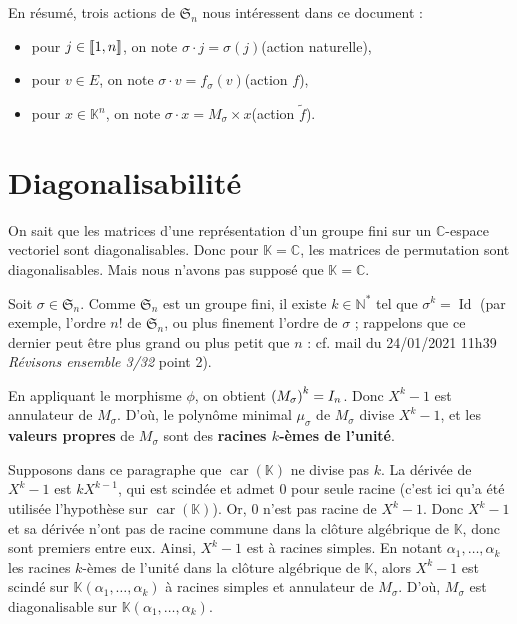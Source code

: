 \documentclass[10pt,a4paper,french,landscape]{article}
\DeclarePairedDelimiter\parenlong{\lparen}{\rparen}
\newcommand{\paren}[1]{\parenlong*{#1}}
\DeclarePairedDelimiter\bracketlong{\llbracket}{\rrbracket}
\newcommand{\br}[1]{\bracketlong*{#1}}
\theoremstyle{definition}
\theoremstyle{remark}
\DeclareMathOperator{\Id}{Id}
\DeclareMathOperator{\car}{car}
\newcommand{\NNs}{\mathbb N^*}
\newcommand{\CC}{\mathbb C}
\newcommand{\KK}{\mathbb K}
\newcommand{\Sy}{\mathfrak{S}}
\newcommand{\1}{\mathbbm{1}}
\newcommand{\Sn}[1][n]{\Sy_{#1}}
\begin{document}
\begin{multicols*}{2}
En résumé, trois actions de $\Sn$ nous intéressent dans ce document :
\begin{itemize}
\item pour $j\in\br{1,n}$, on note $\sigma\cdot j = \sigma(j)$\quad (action naturelle),
\item pour $v\in E$, on note $\sigma\cdot v = f_\sigma(v)$\quad (action $f$),
\item pour $x\in \KK^n$, on note $\sigma\cdot x = M_\sigma\times x$\quad (action $\tilde{f}$).
\end{itemize}

\section{Diagonalisabilité}
\label{sec:diago}

On sait que les matrices d'une représentation d'un groupe fini sur un $\CC$-espace vectoriel sont diagonalisables. Donc pour $\KK=\CC$, les matrices de permutation sont diagonalisables. Mais nous n'avons pas supposé que $\KK=\CC$.

Soit $\sigma\in\Sn$. Comme $\Sn$ est un groupe fini, il existe $k\in\NNs$ tel que $\sigma^{k}=\Id$ (par exemple, l'ordre $n!$ de $\Sn$, ou plus finement l'ordre de $\sigma$ ; rappelons que ce dernier peut être plus grand ou plus petit que $n$ : cf. mail du 24/01/2021 11h39 \textit{Révisons ensemble 3/32} point 2).

En appliquant le morphisme $\phi$, on obtient $\paren{M_\sigma}^{k}=I_n$. Donc $X^{k}-1$ est annulateur de $M_\sigma$. D'où, le polynôme minimal $\mu_\sigma$ de $M_\sigma$ divise $X^{k}-1$, et les \textbf{valeurs propres} de $M_\sigma$ sont des \textbf{racines $k$-èmes de l'unité}.

Supposons dans ce paragraphe que $\car(\KK)$ ne divise pas $k$. La dérivée de $X^{k}-1$ est $kX^{k-1}$, qui est scindée et admet 0 pour seule racine (c'est ici qu'a été utilisée l'hypothèse sur $\car(\KK)$). Or, 0 n'est pas racine de $X^k-1$. Donc $X^k-1$ et sa dérivée n'ont pas de racine commune dans la clôture algébrique de $\KK$, donc sont premiers entre eux. Ainsi, $X^k-1$ est à racines simples. En notant $\alpha_1, \ldots , \alpha_k$ les racines $k$-èmes de l'unité dans la clôture algébrique de $\KK$, alors $X^k-1$ est scindé sur $\KK(\alpha_1, \ldots , \alpha_k)$ à racines simples et annulateur de $M_\sigma$. D'où, $M_\sigma$ est diagonalisable sur $\KK(\alpha_1, \ldots , \alpha_k)$.

\medskip


\end{multicols*}
\end{document}
